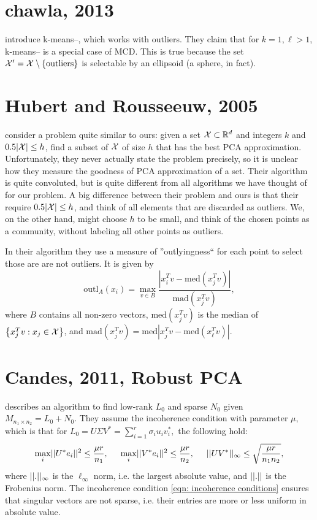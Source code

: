 \documentclass{article}
\begin{document}
\section{chawla, 2013}
\cite{chawla2013k} introduce k-means--, which works with outliers. They claim that for $k=1, \ell>1$, k-means-- is a special case of MCD. This is true because the set $\mathcal{X}' = \mathcal{X} \setminus \text{\{outliers\}}$ is selectable by an ellipsoid (a sphere, in fact).

\section{Hubert and Rousseeuw, 2005}
\cite{hubert2005robpca} consider a problem quite similar to ours: given a set $\mathcal{X} \subset \mathbb{R}^d$ and integers $k$ and $0.5 |\mathcal{X}| \leq h$, find a subset of $\mathcal{X}$ of size $h$ that has the best PCA approximation. Unfortunately, they never actually state the problem precisely, so it is unclear how they measure the goodness of PCA approximation of a set. Their algorithm is quite convoluted, but is quite different from all algorithms we have thought of for our problem. A big difference between their problem and ours is that their require $0.5 |\mathcal{X}| \leq h$, and think of all elements that are discarded as outliers. We, on the other hand, might choose $h$ to be small, and think of the chosen points as a community, without labeling all other points as outliers.

In their algorithm they use a measure of ''outlyingness`` for each point to select those are are not outliers. It is given by
$$\text{outl}_A(x_i) = \max_{v\in B} \frac{|x_i^T v - \text{med}(x_j^T v)|}{\text{mad}(x_j^T v)},$$
where $B$ contains all non-zero vectors, $\text{med}(x_j^T v)$ is the median of $\left\{x_j^T v : x_j \in \mathcal{X}\right\}$, and $\text{mad}(x_j^T v) = \text{med}|x_j^T v - \text{med}(x_{\ell}^T v)|.$

\section{Candes, 2011, Robust PCA}
\cite{candes2011robust} describes an algorithm to find low-rank $L_0$ and sparse $N_0$ given $M_{n_1 \times n_2} = L_0 + N_0$. They assume the incoherence condition with parameter $\mu$, which is that for $L_0 = U\Sigma V^* = \sum_{i=1}^r \sigma_i u_i v_i^*,$ the following hold:
\begin{equation}\label{eqn: incoherence conditions}
    \max_i \norm{U^* e_i}^2 \leq \frac{\mu r}{n_1},\hspace{0.5cm} \max_i \norm{V^* e_i}^2 \leq \frac{\mu r}{n_2},\hspace{0.5cm} \norm{U V^*}_\infty \leq \sqrt{\frac{\mu r}{n_1 n_2}},
\end{equation}
where $||.||_\infty$ is the $\ell_\infty$ norm, i.e. the largest absolute value, and $||.||$ is the Frobenius norm. The incoherence condition \ref{eqn: incoherence conditions} ensures that singular vectors are not sparse, i.e. their entries are more or less uniform in absolute value.
\end{document}
